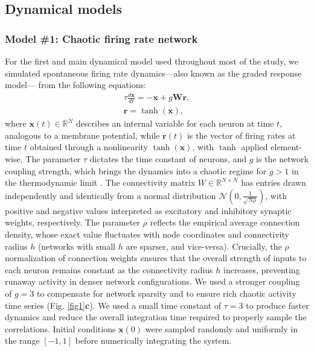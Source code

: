 \documentclass{article}
\begin{document}
\subsection*{Dynamical models}

\subsubsection*{Model \#1: Chaotic firing rate network}

For the first and main dynamical model used throughout most of the study, we simulated spontaneous firing rate dynamics---also known as the graded response model--- from the following equations\cite{gerstner1995time}:
\begin{align*}
    \tau\frac{d\textbf{x}}{dt}=-\textbf{x} + g\textbf{W}\textbf{r},\\
    \textbf{r}=\tanh{(\textbf{x})},
\end{align*}
where $\textbf{x}(t)\in \mathbb{R}^N$ describes an internal variable for each neuron at time $t$, analogous to a membrane potential, while $\textbf{r}(t)$ is the vector of firing rates at time $t$ obtained through a nonlinearity $\tanh (\textbf{x})$, with $\tanh$ applied element-wise. The parameter $\tau$ dictates the time constant of neurons, and $g$ is the network coupling strength, which brings the dynamics into a chaotic regime for $g>1$ in the thermodynamic limit \cite{sompolinsky1988chaos}. The connectivity matrix $W \in \mathbb{R}^{N \times N}$ has entries drawn independently and identically from a normal distribution $\mathcal{N}\left(0, \frac{1}{\sqrt{N\rho}}\right)$, with positive and negative values interpreted as excitatory and inhibitory synaptic weights, respectively. The parameter $\rho$ reflects the empirical average connection density, whose exact value fluctuates with node coordinates and connectivity radius $h$ (networks with small $h$ are sparser, and vice-versa). Crucially, the $\rho$ normalization of connection weights ensures that the overall strength of inputs to each neuron remains constant as the connectivity radius $h$ increases, preventing runaway activity in denser network configurations. We used a stronger coupling of $g=3$ to compensate for network sparsity and to ensure rich chaotic activity time series (Fig. \ref{fig1}\textbf{c}). We used a small time constant of $\tau=3$ to produce faster dynamics and reduce the overall integration time required to properly sample the correlations. Initial conditions $\textbf{x}(0)$ were sampled randomly and uniformly in the range $[-1, 1]$ before numerically integrating the system.
\end{document}
